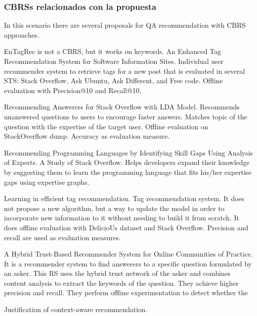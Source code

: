 \documentclass[preprint]{elsarticle}
\begin{document}
\begin{spacing}{2}
\subsubsection{CBRSs relacionados con la propuesta}

In this scenario there are several proposals for QA recommendation with CBRS approaches.

EnTagRec \cite{Wang2014} is not a CBRS, but it works on keywords. An Enhanced Tag Recommendation System for Software Information Sites. Individual user recommender system to retrieve tags for a new post that is evaluated in several STS: Stack Overflow, Ask Ubuntu, Ask Different, and Free code. Offline evaluation with Precision@10 and Recall@10.

\cite{Shao2017} Recommending Answerers for Stack Overflow with LDA Model. Recommends unanswered questions to users to encourage faster answers. Matches topic of the question with the expertise of the target user. Offline evaluation on StackOverflow dump. Accuracy as evaluation measure.

\cite{Odiete2017} Recommending Programming Languages by Identifying Skill Gaps Using Analysis of Experts. A Study of Stack Overflow. Helps developers expand their knowledge by suggesting them to learn the programming language that fits his/her expertise gaps using expertise graphs.

\cite{Lipczak2010} Learning in efficient tag recommendation. Tag recommendation system. It does not propose a new algorithm, but a way to update the model in order to incorporate new information to it without needing to build it from scratch. It does offline evaluation with DelicioUs dataset and Stack Overflow. Precision and recall are used as evaluation measures.

\cite{Zheng2015b} A Hybrid Trust-Based Recommender System for Online Communities of Practice. It is a recommender system to find answerers to a specific question formulated by an asker. This RS uses the hybrid trust network of the asker and combines content analysis to extract the keywords of the question. They achieve higher precision and recall. They perform offline experimentation to detect whether the



Justification of context-aware recommendation.



\end{spacing}
\end{document}

